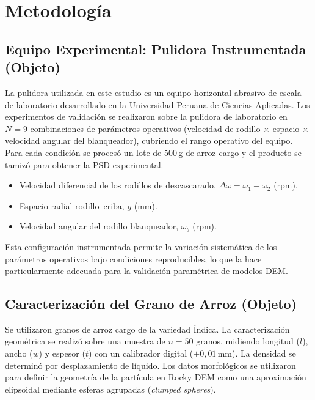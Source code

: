 \documentclass[conference]{IEEEtran}
\begin{document}
\section{Metodología}

\subsection{Equipo Experimental: Pulidora Instrumentada (Objeto)}
La pulidora utilizada en este estudio es un equipo horizontal abrasivo de escala de laboratorio desarrollado en la Universidad Peruana de Ciencias Aplicadas.
Los experimentos de validación se realizaron sobre la pulidora de laboratorio en $N=9$ combinaciones de parámetros operativos (velocidad de rodillo $\times$ espacio $\times$ velocidad angular del blanqueador), cubriendo el rango operativo del equipo. Para cada condición se procesó un lote de 500\,g de arroz cargo y el producto se tamizó para obtener la PSD experimental.

\begin{itemize}[noitemsep]
\item Velocidad diferencial de los rodillos de descascarado, $\Delta\omega = \omega_{1} - \omega_{2}$ (rpm).
\item Espacio radial rodillo--criba, $g$ (mm).
\item Velocidad angular del rodillo blanqueador, $\omega_{b}$ (rpm).
\end{itemize}

Esta configuración instrumentada permite la variación sistemática de los parámetros operativos bajo condiciones reproducibles, lo que la hace particularmente adecuada para la validación paramétrica de modelos DEM.

\subsection{Caracterización del Grano de Arroz (Objeto)}
Se utilizaron granos de arroz cargo de la variedad Índica. La caracterización geométrica se realizó sobre una muestra de $n=50$ granos, midiendo longitud ($l$), ancho ($w$) y espesor ($t$) con un calibrador digital ($\pm 0{,}01$\,mm). La densidad se determinó por desplazamiento de líquido. Los datos morfológicos se utilizaron para definir la geometría de la partícula en Rocky DEM como una aproximación elipsoidal mediante esferas agrupadas (\textit{clumped spheres}).
\end{document}
